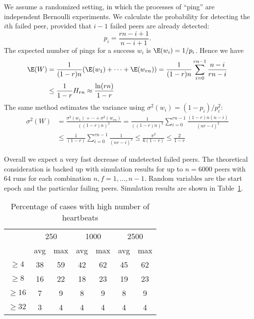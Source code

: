 We assume a randomized setting, in which the processes of ``ping'' are independent Bernoulli experiments.
We calculate the probability for detecting the $i$th failed peer, provided that $i-1$ failed peers are already detected:
\[ p_i = \frac{rn-i+1}{n-i+1}. \]
The expected number of pings for a success $w_i$ is $\E(w_i) = 1/p_i$.
Hence we have
\begin{align*}
	\E(W) &= \frac{1}{(1-r)n}(\E(w_1) + \cdots + \E(w_{rn})) = \frac{1}{(1-r)n}\sum_{i=0}^{rn-1}\frac{n-i}{rn-i} \\
		&\leq \frac{1}{1-r}H_{rn} \approx \frac{\ln(rn)}{1-r}
\end{align*}
The same method estimates the variance using $\sigma^2(w_i)=(1-p_i)/p_i^2$:
\begin{align*}
	\sigma^2(W )&=\frac{\sigma^2(w_1)+\cdots+\sigma^2(w_{rn})}{((1-r)n)^2} = \frac{1}{((1-r)n)^2}\sum_{i=0}^{rn-1}\frac{(1-r)n(n-i)}{(nr-i)^2} \\
		& \leq \frac{1}{(1-r)}\sum_{i=0}^{rn-1}\frac{1}{(nr-i)^2} \leq \frac{\pi^2}{6(1-r)} \leq \frac{2}{1-r}
\end{align*}

Overall we expect a very fast decrease of undetected failed peers.
The theoretical consideration is backed up with simulation results for up to $n=6000$ peers with 64 runs for each combination $n, f=1,\dots,n-1$.
Random variables are the start epoch and the particular failing peers.
Simulation results are shown in Table~\ref{tab:simpingpong}.
\begin{table}
	\begin{center}
		\footnotesize
		\begin{tabular}{|c|cc|cc|cc|}\hline
			\multirow{2}{*}{\backslashbox{Heartbeats}{Peers}} & \multicolumn{2}{c|}{250} & \multicolumn{2}{c|}{1000} & \multicolumn{2}{c|}{2500} \\
				& avg & max & avg & max & avg & max \\ \hline
			$\geq 4$ & 38 & 59 & 42 & 62 & 45 & 62 \\
			$\geq 8$ & 16 & 22 & 18 & 23 & 19 & 23 \\
			$\geq 16$ & 7 & 9 & 8 & 9 & 8 & 9 \\
			$\geq 32$ & 3 & 4 & 4 & 4 & 4 & 4 \\
			\hline
		\end{tabular}
	\end{center}
	\caption{Percentage of cases with high number of heartbeats}
	\label{tab:simpingpong}
\end{table}


